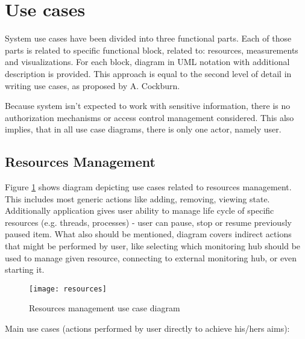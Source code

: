 %


\section{Use cases}
\label{sec:ch4_usecases}

System use cases have been divided into three functional parts. Each of those parts is related to specific functional
block, related to: resources, measurements and visualizations. For each block, diagram in UML notation with additional
description is provided. This approach is equal to the second level of detail in writing use cases, as proposed by A.
Cockburn\cite{0201702258}. 

Because system isn't expected to work with sensitive information, there is no authorization mechanisms or access
control management considered. This also implies, that in all use case diagrams, there is only one actor, namely
user.

\pagebreak

\subsection{Resources Management}
\label{subsec:resources_mgmnt}

Figure \ref{fig:usecase_resources} shows diagram depicting use cases related to resources management. This includes most
generic actions like adding, removing, viewing state. Additionally application gives user ability to manage life cycle
of specific resources (e.g. threads, processes) - user can pause, stop or resume previously paused item. What also
should be mentioned, diagram covers indirect actions that might be performed by user, like selecting which monitoring
hub should be used to manage given resource, connecting to external monitoring hub, or even starting it.

\begin{figure}[ht]
  \centering
  \texttt{[image: resources]}
  \caption{Resources management use case diagram}
  \label{fig:usecase_resources}
\end{figure}

Main use cases (actions performed by user directly to achieve his/hers aims):

